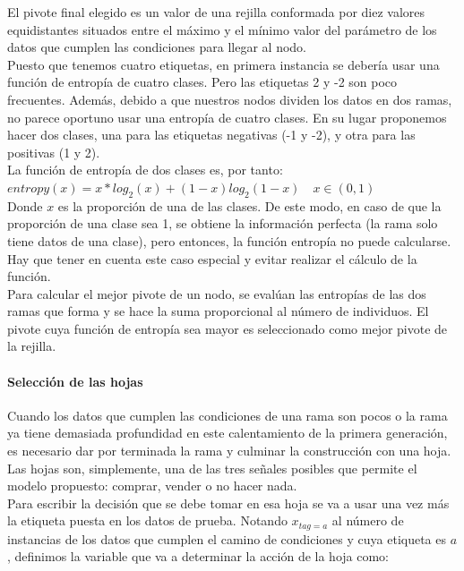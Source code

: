 El pivote final elegido es un valor de una rejilla conformada por diez valores equidistantes situados entre el m\'aximo y el m\'inimo valor del par\'ametro de los datos que cumplen las condiciones para llegar al nodo. \\

Puesto que tenemos cuatro etiquetas, en primera instancia se deber\'ia usar una funci\'on de entrop\'ia de cuatro clases. Pero las etiquetas 2 y -2 son poco frecuentes. Adem\'as, debido a que nuestros nodos dividen los datos en dos ramas, no parece oportuno usar una entrop\'ia de cuatro clases. En su lugar proponemos hacer dos clases, una para las etiquetas negativas (-1 y -2), y otra para las positivas (1 y 2).\\

La funci\'on de entrop\'ia de dos clases es, por tanto:\\

$entropy(x) = x*log_{2}(x) + (1-x)log_{2}(1-x) \quad x\in(0,1)$\\

Donde $x$ es la proporci\'on de una de las clases. De este modo, en caso de que la proporci\'on de una clase sea 1, se obtiene la informaci\'on perfecta (la rama solo tiene datos de una clase), pero entonces, la funci\'on entrop\'ia no puede calcularse. Hay que tener en cuenta este caso especial  y evitar realizar el c\'alculo de la funci\'on.\\

Para calcular el mejor pivote de un nodo, se eval\'uan las entrop\'ias de las dos ramas que forma y se hace la suma proporcional al n\'umero de individuos. El pivote cuya funci\'on de entrop\'ia sea mayor es seleccionado como mejor pivote de la rejilla.\\

\paragraph{Selecci\'on de las hojas}
Cuando los datos que cumplen las condiciones de una rama son pocos o la rama ya tiene demasiada profundidad en este calentamiento de la primera generaci\'on, es necesario dar por terminada la rama y culminar la construcci\'on con una hoja.\\

Las hojas son, simplemente, una de las tres se\~nales posibles que permite el modelo propuesto: comprar, vender o no hacer nada.\\

Para escribir la decisi\'on que se debe tomar en esa hoja se va a usar una vez m\'as la etiqueta puesta en los datos de prueba. Notando $x_{tag=a}$ al n\'umero de instancias de los datos que cumplen el camino de condiciones y cuya etiqueta es $a$, definimos la variable que va a determinar la acci\'on de la hoja como:\\

